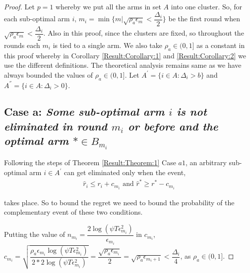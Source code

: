 \begin{proof}
Let $p=1$ whereby we put all the arms in set $A$ into one cluster. So, for each sub-optimal arm ${i}$, $m_{i}=\min{\lbrace m|\sqrt{\rho_{a}\epsilon_{m}} < \dfrac{\Delta_{i}}{2} \rbrace}$ be the first round when $\sqrt{\rho_{a}\epsilon_{m}} < \dfrac{\Delta_{i}}{2}$. Also in this proof, since the clusters are fixed, so throughout the rounds each $m_{i}$ is tied to a single arm. We also take $\rho_{a}\in (0,1]$ as a constant in this proof whereby in Corollary \ref{Result:Corollary:1} and \ref{Result:Corollary:2} we use the different definitions. The theoretical analysis remains same as we have always bounded the values of $\rho_{a}\in (0,1]$. Let $A^{'}=\lbrace i\in A: \Delta_{i} > b \rbrace$ and $A^{''}=\lbrace i\in A: \Delta_{i} > 0 \rbrace$.


\subsection*{Case a: \textit{Some sub-optimal arm ${i}$ is not eliminated in round $m_{i}$ or before and the optimal arm ${*}\in B_{m_{i}}$}}

  
	Following the steps of Theorem \ref{Result:Theorem:1} Case $a1$, an arbitrary sub-optimal arm ${i}\in A^{'}$ can get eliminated only when the event,
	\begin{align}
	\hat{r}_{i}  \le r_{i} + c_{m_{i}} \text{ and } \label{eq:appA:armelim-casea}
 	\hat{r}^{*}\geq  r^{*} - c_{m_{i}}
	\end{align}
	
	takes place. So to bound the regret we need to bound the probability of the complementary event of these two conditions.
  
  Putting the value of $n_{m_{i}}=\dfrac{2\log{(\psi T\epsilon_{m_{i}}^{2})}}{\epsilon_{m_{i}}}$ in $c_{m_{i}}$,
  $c_{m_{i}}=\sqrt{\dfrac{\rho_{a}\epsilon_{m_{i}}\log (\psi T\epsilon_{m_{i}}^{2})}{2*2 \log(\psi T\epsilon_{m_{i}}^{2})}}=\dfrac{\sqrt{\rho_{a}\epsilon_{m_{i}}}}{2} = \sqrt{\rho_{a}\epsilon_{m_{i}+1}} < \dfrac{\Delta_{i}}{4} $, as $\rho_{a}\in (0,1]$.
  

\end{proof}
